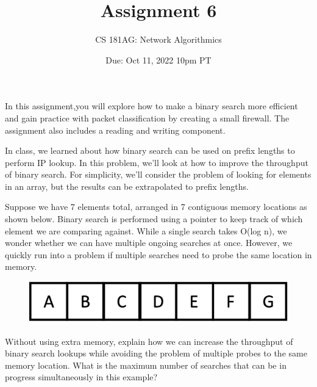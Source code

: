 \documentclass[10pt]{article}
\date{Due: Oct 11, 2022 10pm PT}
\newenvironment{problem}[2][Problem]{\begin{trivlist}
\item[\hskip \labelsep {\bfseries #1}\hskip \labelsep {\bfseries #2.}]}{\end{trivlist}}
\begin{document}
 
\title{Assignment 6}
\author{
CS 181AG: Network Algorithmics}
\maketitle

In this assignment,you will explore how to make a binary search more efficient and gain practice with packet classification by creating a small firewall. The assignment also includes a reading and writing component.

\begin{problem}{1: Improving Binary Search}
In class, we learned about how binary search can be used on prefix lengths to perform IP lookup. In this problem, we'll look at how to improve the throughput of binary search. For simplicity, we'll consider the problem of looking for elements in an array, but the results can be extrapolated to prefix lengths.

Suppose we have 7 elements total, arranged in 7 contiguous memory locations as shown below. Binary search is performed using a pointer to keep track of which element we are comparing against. While a single search takes O(log n), we wonder whether we can have multiple ongoing searches at once. However, we quickly run into a problem if multiple searches need to probe the same location in memory. 

\begin{figure}[h]
    \centering
    \includegraphics[scale=0.2]{figures/bin_search.pdf}
    \label{fig:bin_search}
\end{figure}

Without using extra memory, explain how we can increase the throughput of binary search lookups while avoiding the problem of multiple probes to the same memory location. What is the maximum number of searches that can be in progress simultaneously in this example?
\end{problem}
\end{document}

